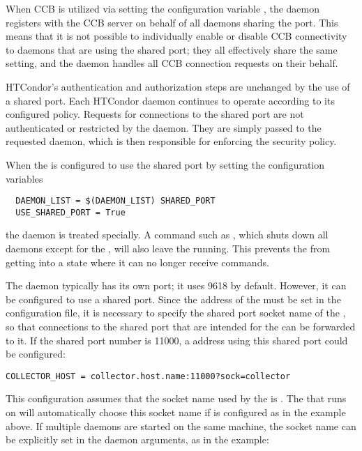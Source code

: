 When CCB is utilized via setting the configuration variable
,
the  daemon registers with
the CCB server on behalf of all daemons sharing the port.
This means that it is not possible to individually enable or disable
CCB connectivity to daemons that are using the shared port;
they all effectively share the same setting,
and the  daemon handles all CCB connection
requests on their behalf.

HTCondor's authentication and authorization steps are unchanged by the
use of a shared port.  Each HTCondor daemon continues to operate
according to its configured policy.  Requests for connections to the
shared port are not authenticated or restricted by
the  daemon.
They are simply passed to the requested daemon,
which is then responsible for enforcing the security policy.

When the  is configured to use the shared port
by setting the configuration variables
\begin{verbatim}
  DAEMON_LIST = $(DAEMON_LIST) SHARED_PORT
  USE_SHARED_PORT = True
\end{verbatim}
the  daemon is treated specially. 
A command such as ,
which shuts down all daemons except for the ,
will also leave the  running.
This prevents the  from getting into a state
where it can no longer receive commands.

The  daemon typically has its own port;
it uses 9618 by default.
However, it can be configured to use a shared port.
Since the address of the  must be set in 
the configuration file,
it is necessary to specify the shared port socket name of 
the ,
so that connections to the shared port that are intended for 
the  can be forwarded to it.
If the shared port number is 11000, a  address using this
shared port could be configured:

\footnotesize
\begin{verbatim}
COLLECTOR_HOST = collector.host.name:11000?sock=collector
\end{verbatim}
\normalsize

This configuration assumes that the socket name used by 
the  is .
The  that runs on 
will automatically choose this socket name if 
is configured as in the example above.
If multiple  daemons are started on the same
machine, the socket name can be explicitly set in the daemon arguments,
as in the example:

